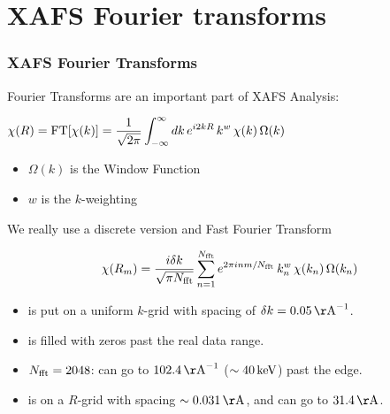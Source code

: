 \section{XAFS Fourier transforms}

\begin{frame} \frametitle{XAFS Fourier Transforms}

\begin{cenpage}{130mm}  
Fourier Transforms are an important part of XAFS Analysis:

\begin{postitbox}{75mm}  $\displaystyle{ \chi(R) = {\rm FT}[\chi(k)] =
  \frac{1}{\sqrt{2\pi}}
  \int_{-\infty}^{\infty} { dk \, e^{i2kR} \, k^w \, \chi(k) \, \Omega(k) }} $
\end{postitbox}

\begin{itemize}
\item $\Omega(k)$ is the Window Function
\item $w$ is the $k$-weighting
\end{itemize}

\pause
\vmm
 We really use a discrete version and Fast Fourier Transform

\[
\chi(R_m) = \frac{i \delta k}{\sqrt{\pi N_{\rm fft}}}
\sum_{n=1}^{N_{\rm fft}}
e^{2\pi i n m/N_{\rm fft}} \,  k_n^w \, \chi(k_n)\, \Omega(k_n)
\]

\pause
\begin{itemize}
\item {\chik} is put on a uniform $k$-grid with spacing of  $\delta k=0.05
  {\rm\,  \AA}^{-1}$.
\item {\chik} is filled with zeros past the real data range.

\item $N_{\rm fft} = 2048$: {\chik} can go to $102.4 {\rm\, \AA}^{-1}$
  ($\sim 40\rm \, keV$) past the edge.

\item {\chir} is on a $R$-grid with spacing $\sim0.031\,\rm\AA$, and can
  go to $31.4 \,\rm\AA$.
\end{itemize}
\end{cenpage}

\end{frame}

